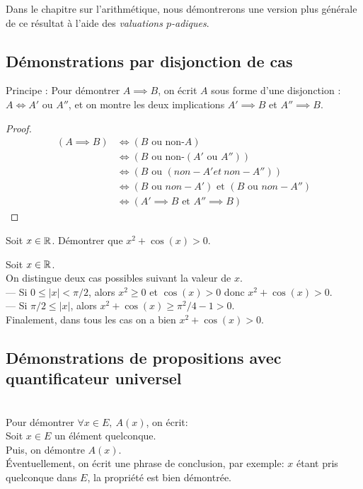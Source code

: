 Dans le chapitre sur l'arithmétique, nous démontrerons une version plus générale de ce résultat à l'aide des \emph{valuations $p$-adiques}.


\subsection{Démonstrations par disjonction de cas}
Principe : Pour démontrer $A\implies B$, on écrit $A$ sous forme d'une disjonction : $A\iff A'\text{ ou }A''$, et on montre les deux implications $A'\implies B$ et $A''\implies B$.

\begin{proof}
\begin{align*}
(A\implies B )
&\iff (B \text{ ou non-}A)\\
&\iff   (B \text{ ou non-}(A' \text{ ou } A''))\\
&\iff (B \text{ ou } (non-A' et \: non-A''))\\
&\iff (B \text{ ou } non-A') \text{ et } (B \text{ ou } non-A'')\\
&\iff (A'\implies B \text{ et } A''\implies B)
\end{align*}
\end{proof}

\begin{exemple}
Soit $x\in \mathbb{R}$. Démontrer que $x^2+\cos(x)>0$.
\begin{red}
Soit $x\in\mathbb{R}$.\\
On distingue deux cas possibles suivant la valeur de $x$.\\
--- Si $0\leq |x|< \pi/2$, alors $x^2\geq 0$ et $\cos(x)> 0$ donc $x^2+\cos(x)>0$.\\
--- Si  $\pi/2\leq|x|$, alors $x^2+\cos(x)\geq \pi^2/4-1>0$.\\
Finalement, dans tous les cas on a bien $x^2+\cos(x)>0$.
\end{red}
\end{exemple}

\subsection{Démonstrations de propositions avec quantificateur universel}$ $\\

Pour démontrer $\forall x\in E,\:A(x)$, on écrit:\\
\og Soit $x\in E$ un élément quelconque\fg.\\
Puis, on démontre $A(x)$.\\
Éventuellement, on écrit une phrase de conclusion, par exemple: \og $x$ étant pris quelconque dans $E$, la propriété est bien démontrée\fg.\\


